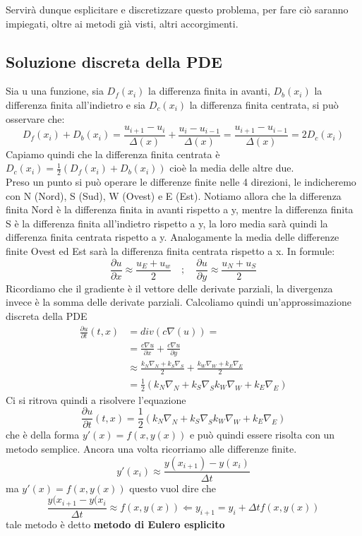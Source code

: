Servirà dunque esplicitare e discretizzare questo problema, per fare ciò saranno impiegati, oltre ai metodi già visti, altri accorgimenti.\\

\newpage
\subsection{Soluzione discreta della PDE}
Sia u una funzione, sia $D_f(x_i)$ la differenza finita in avanti, $D_b(x_i)$ la differenza finita all'indietro e sia $D_c(x_i)$ la differenza finita centrata, si può osservare che:
$$
D_f(x_i)+D_b(x_i)= \frac{u_{i+1} - u_{i}}{\Delta(x)} + \frac{u_{i} - u_{i-1}}{\Delta(x)} = \frac{u_{i+1} - u_{i-1}}{\Delta(x)} = 2D_c(x_i)
$$
Capiamo quindi che la differenza finita centrata è $D_c(x_i)=\frac{1}{2}(D_f(x_i)+D_b(x_i))$ cioè la media delle altre due.\\ Preso un punto si può operare le differenze finite nelle 4 direzioni, le indicheremo con N (Nord), S (Sud), W (Ovest) e E (Est). Notiamo allora che la differenza finita Nord è la differenza finita in avanti rispetto a y, mentre la differenza finita S è la differenza finita all'indietro rispetto a y, la loro media sarà quindi la differenza finita centrata rispetto a y. Analogamente la media delle differenze finite Ovest ed Est sarà la differenza finita centrata rispetto a x. In formule:\\
$$
\frac{\partial u}{\partial x} \approx \frac{u_E+u_w}{2} \hspace{1em};\hspace{1em}
\frac{\partial u}{\partial y} \approx \frac{u_N+u_S}{2}
$$
Ricordiamo che il gradiente è il vettore delle derivate parziali, la divergenza invece è la somma delle derivate parziali.
Calcoliamo quindi un'approssimazione discreta della PDE\\
\begin{align}
    \frac{\partial u}{\partial t}(t,x)&=div(c\nabla(u))=\\
    &=\frac{c\nabla u}{\partial x} +\frac{c\nabla u}{\partial y}\\
    &\approx\frac{k_N\nabla_N + k_S\nabla_S}{2} +\frac{k_W\nabla_W + k_E\nabla_E}{2}\\
    &=\frac{1}{2}(k_N\nabla_N + k_S\nabla_S k_W\nabla_W + k_E\nabla_E) 
\end{align}
Ci si ritrova quindi a risolvere l'equazione 
$$
\frac{\partial u}{\partial t}(t,x)=\frac{1}{2}(k_N\nabla_N + k_S\nabla_S k_W\nabla_W + k_E\nabla_E) 
$$
che è della forma $y'(x)=f(x,y(x))$ e può quindi essere risolta con un metodo semplice.
Ancora una volta ricorriamo alle differenze finite.
$$
y'(x_i)\approx \frac{y(x_{i+1})-y(x_{i})}{\Delta t} 
$$
ma $y'(x)=f(x,y(x))$ questo vuol dire che
$$
\frac{y(x_{i+1}-y(x_{i}}{\Delta t}\approx f(x,y(x)) \Leftarrow y_{i+1} = y_{i} + \Delta t f(x,y(x))
$$
tale metodo è detto \textbf{metodo di Eulero esplicito}\cite{monegato}

